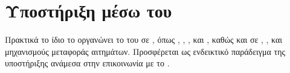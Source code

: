 \section{Υποστήριξη μέσω του }
\label{sec:appendix_sdk_contract_support}

Πρακτικά το ίδιο το \texttt{} οργανώνει το  του 
σε , όπως \texttt{}, \texttt{}, \texttt{},
\texttt{} και \texttt{}, καθώς και σε , ,
 και μηχανισμούς μεταφοράς  αιτημάτων. Προσφέρεται ως ενδεικτικό παράδειγμα της υποστήριξης ανάμεσα στην επικοινωνία
με το .

\begin{table}[H]
\centering
\caption{Υποστήριξη}
\label{tab:appendix_api_documentation_support_matrix}

\end{table}
